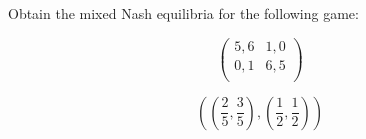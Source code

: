 \documentclass{article}
\begin{document}
\hrulefill
\begin{multicols}{2}

    Obtain the mixed Nash equilibria for the following game:

    \[
        \begin{pmatrix}
            5, 6 & 1, 0\\
            0, 1 & 6, 5\\
        \end{pmatrix}
    \]

    \columnbreak

    \[
        \left(\left(\frac{2}{5}, \frac{3}{5}\right), \left(\frac{1}{2}, \frac{1}{2}\right)\right)
    \]

\end{multicols}
\end{document}
